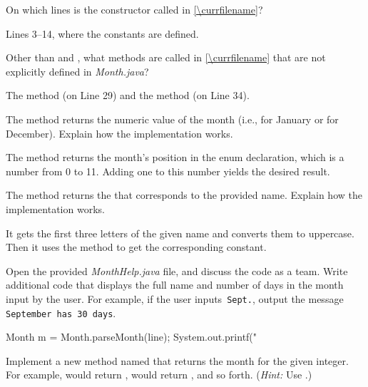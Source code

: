 \Q On which lines is the  constructor called in \ref{\currfilename}?

\begin{answer}[3em]
Lines 3--14, where the  constants are defined.
\end{answer}


\Q Other than  and , what methods are called in \ref{\currfilename} that are not explicitly defined in \textit{Month.java}?

\begin{answer}[3em]
The  method (on Line 29) and the  method (on Line 34).
\end{answer}


\Q The  method returns the numeric value of the month (i.e.,  for January or  for December).
Explain how the implementation works.

\begin{answer}
The  method returns the month's position in the enum declaration, which is a number from 0 to 11.
Adding one to this number yields the desired result.
\end{answer}


\Q The  method returns the  that corresponds to the provided name.
Explain how the implementation works.

\begin{answer}
It gets the first three letters of the given name and converts them to uppercase.
Then it uses the  method to get the corresponding  constant.
\end{answer}


\Q \label{HelpV1}
Open the provided \textit{MonthHelp.java} file, and discuss the code as a team.
Write additional code that displays the full name and number of days in the month input by the user.
For example, if the user inputs \,\verb|Sept.|, output the message \,\verb|September has 30 days|.

\begin{answer}[6em]
\begin{javaans}
Month m = Month.parseMonth(line);
System.out.printf("%
\end{javaans}
\end{answer}


\Q Implement a new method named  that returns the month for the given integer.
For example,  would return ,  would return , and so forth.
(\textit{Hint:} Use .)

